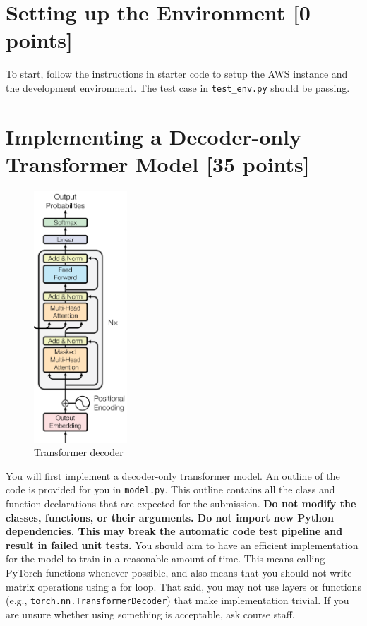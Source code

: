 \documentclass[leqno,12pt]{article}
\begin{document}
\newpage
\section{Setting up the Environment [0 points]}

To start, follow the instructions in starter code to setup the AWS instance and the development environment.
The test case in \texttt{test\_env.py} should be passing.

\section{Implementing a Decoder-only Transformer Model [35 points]}

\begin{figure}
    \centering
    \includegraphics[width=3.5cm]{figures/fig1-q1-transformer-decoder.png}
    \caption{Transformer decoder}
    \label{fig:transformer-decoder}
\end{figure}

You will first implement a decoder-only transformer model. 
An outline of the code is provided for you in \texttt{model.py}. This outline contains all the 
class and function declarations that are expected for the submission.
\textbf{Do not modify the classes, functions, or their arguments. Do not import new Python dependencies. This may break the automatic code test pipeline and result in failed unit tests.}
You should aim to have an efficient implementation for the model to train in a reasonable amount of time. This means calling PyTorch functions whenever possible, and also means that you should not write matrix operations using a for loop.
That said, you may not use layers or functions (e.g., {\tt torch.nn.TransformerDecoder}) that make implementation trivial. If you are unsure whether using something is acceptable, ask course staff.
\newline
\end{document}
